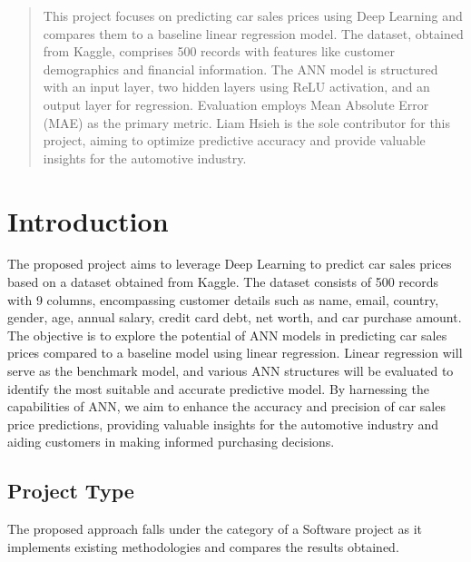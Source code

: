 \documentclass[manuscript,screen,review,nonacm]{acmart}
\begin{document}
\begin{abstract}
This project focuses on predicting car sales prices using Deep Learning and compares them to a baseline linear regression model. The dataset, obtained from Kaggle, comprises 500 records with features like customer demographics and financial information. The ANN model is structured with an input layer, two hidden layers using ReLU activation, and an output layer for regression. Evaluation employs Mean Absolute Error (MAE) as the primary metric. Liam Hsieh is the sole contributor for this project, aiming to optimize predictive accuracy and provide valuable insights for the automotive industry.
\end{abstract}



\maketitle

\section{Introduction}
The proposed project aims to leverage Deep Learning to predict car sales prices based on a dataset obtained from Kaggle. The dataset consists of 500 records with 9 columns, encompassing customer details such as name, email, country, gender, age, annual salary, credit card debt, net worth, and car purchase amount. The objective is to explore the potential of ANN models in predicting car sales prices compared to a baseline model using linear regression. Linear regression will serve as the benchmark model, and various ANN structures will be evaluated to identify the most suitable and accurate predictive model. By harnessing the capabilities of ANN, we aim to enhance the accuracy and precision of car sales price predictions, providing valuable insights for the automotive industry and aiding customers in making informed purchasing decisions.

\subsection{Project Type}
The proposed approach falls under the category of a Software project as it implements existing methodologies and
compares the results obtained.
\end{document}
